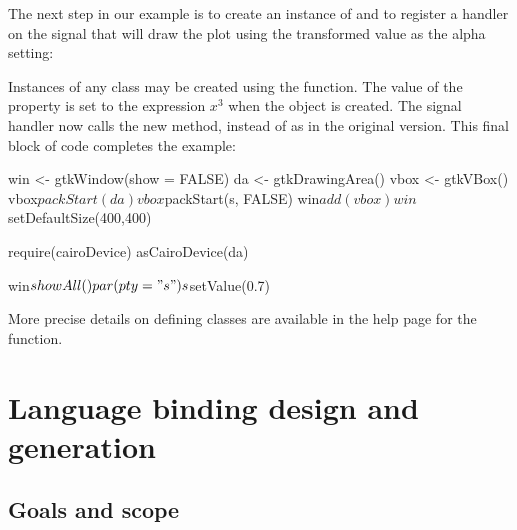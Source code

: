 \documentclass[article,shortnames]{jss}
\begin{document}
The next step in our example is to create an instance
of  and to register a handler on the 
 signal that will draw the plot using the
transformed
value as 
the alpha setting:
Instances of any  class may be created using the
 function.  The value of the  property is set
to the  expression $x^3$ when the object is created.  The
signal handler
now calls the new  method, instead of
 as in the original version. This final block of code
completes the example:
\begin{Code}
win <- gtkWindow(show = FALSE)
da <- gtkDrawingArea()
vbox <- gtkVBox()
vbox$packStart(da)
vbox$packStart(s, FALSE)
win$add(vbox)
win$setDefaultSize(400,400)

require(cairoDevice)
asCairoDevice(da)

win$showAll()
par(pty = "s")
s$setValue(0.7)
\end{Code}

More precise details on defining  classes are available
in the 
 help page for the  function.


\section{Language binding design and generation}

\subsection{Goals and scope}
\end{document}
